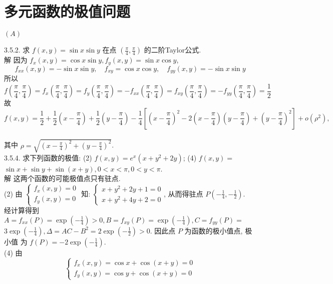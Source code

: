 \documentclass[a4paper,11pt,UTF8]{article}
\begin{document}
\section{多元函数的极值问题}
\centerline{$(A)$}
3.5.2. 求 $f(x, y)=\sin x \sin y$ 在点 $\left(\frac{\pi}{4}, \frac{\pi}{4}\right)$ 的二阶Taylor公式.\\
解 因为 $f_x(x, y)=\cos x \sin y, f_y(x, y)=\sin x \cos y$,\\
$$
f_{x x}(x, y)=-\sin x \sin y, \quad f_{x y}=\cos x \cos y, \quad f_{y y}(x, y)=-\sin x \sin y
$$
所以
$$
f\left(\frac{\pi}{4}, \frac{\pi}{4}\right)=f_x\left(\frac{\pi}{4}, \frac{\pi}{4}\right)=f_y\left(\frac{\pi}{4}, \frac{\pi}{4}\right)=-f_{x x}\left(\frac{\pi}{4}, \frac{\pi}{4}\right)=f_{x y}\left(\frac{\pi}{4}, \frac{\pi}{4}\right)=-f_{y y}\left(\frac{\pi}{4}, \frac{\pi}{4}\right)=\frac{1}{2}
$$
故
$$
f(x, y)=\frac{1}{2}+\frac{1}{2}\left(x-\frac{\pi}{4}\right)+\frac{1}{2}\left(y-\frac{\pi}{4}\right)-\frac{1}{4}\left[\left(x-\frac{\pi}{4}\right)^2-2\left(x-\frac{\pi}{4}\right)\left(y-\frac{\pi}{4}\right)+\left(y-\frac{\pi}{4}\right)^2\right]+o\left(\rho^2\right),
$$\\
其中 $\rho=\sqrt{\left(x-\frac{\pi}{4}\right)^2+\left(y-\frac{\pi}{4}\right)^2}$.\\
3.5.4. 求下列函数的极值: (2) $f(x, y)=e^x\left(x+y^2+2 y\right)$; (4) $f(x, y)=$ $\sin x+\sin y+\sin (x+y), 0<x<\pi, 0<y<\pi$.\\
解 这两个函数的可能极值点只有驻点.\\
(2) 由 $\left\{\begin{array}{l}f_x(x, y)=0 \\ f_y(x, y)=0\end{array}\right.$ 知: $\left\{\begin{array}{l}x+y^2+2 y+1=0 \\ x+y^2+4 y+2=0\end{array}\right.$, 从而得驻点 $P\left(-\frac{1}{4},-\frac{1}{2}\right)$.\\
 经计算得到 $A=f_{x x}(P)=\exp \left(-\frac{1}{4}\right)>0, B=f_{x y}(P)=\exp \left(-\frac{1}{4}\right), C=f_{y y}(P)=$ $3 \exp \left(-\frac{1}{4}\right), \Delta=A C-B^2=2 \exp \left(-\frac{1}{2}\right)>0$. 因此点 $P$ 为函数的极小值点, 极小值 为 $f(P)=-2 \exp \left(-\frac{1}{4}\right)$.\\
(4) 由
$$
\left\{\begin{array}{l}
	f_x(x, y)=\cos x+\cos (x+y)=0 \\
	f_y(x, y)=\cos y+\cos (x+y)=0
\end{array}\right.
$$
\end{document}
